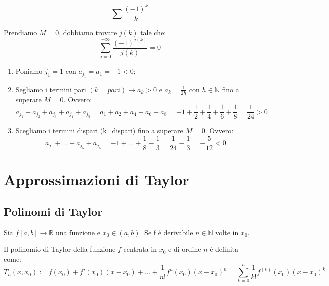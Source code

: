 \begin{example}
    \begin{equation*}
        \sum \frac{(-1)^k}{k}
    \end{equation*}
    
    Prendiamo $M=0$, dobbiamo trovare $j(k)$ tale che:
    \begin{equation*}\sum^{+\infty}_{j=0}\frac{(-1)^{j(k)}}{j(k)}=0\end{equation*}
    
    \begin{enumerate}
        \item Poniamo $j_1=1$ con $a_{j_1}=a_1=-1<0$;
        \item Segliamo i termini pari $(k=pari)\to a_k>0$ e $a_k=\frac{1}{2h}$ con $h\in\mathbb{N}$ fino a superare $M=0$. Ovvero:
        \begin{equation*}
            a_{j_1}+a_{j_2}+a_{j_3}+a_{j_4}+a_{j_5}=a_1+a_2+a_4+a_6+a_8=-1+\frac{1}{2}+\frac{1}{4}+\frac{1}{6}+\frac{1}{8}=\frac{1}{24}>0
        \end{equation*}
        \item Scegliamo i termini dispari (k=dispari) fino a superare $M=0$. Ovvero:
        \begin{equation*}
            a_{j_1}+...+a_{j_5}+a_{j_6}=-1+...+\frac{1}{8}-\frac{1}{3}=\frac{1}{24}-\frac{1}{3}=-\frac{5}{12}<0
        \end{equation*}
    \end{enumerate}
\end{example}

\chapter{Approssimazioni di Taylor}
\section{Polinomi di Taylor}
Sia $f[a,b]\to\mathbb{R}$ una funzione e $x_0\in(a,b)$. Se f è derivabile $n\in\mathbb{N}$ volte in $x_0$.

\begin{definition*}
    Il polinomio di Taylor della funzione $f$ centrata in $x_0$ e di ordine $n$ è definita come:
    \begin{equation*}
        T_n(x,x_0):=f(x_0)+f'(x_0)(x-x_0)+...+\frac{1}{n!}f^n(x_0)(x-x_0)^n=\sum^n_{k=0}\frac{1}{k!}f^{(k)}(x_0)(x-x_0)^k
    \end{equation*}
\end{definition*}

